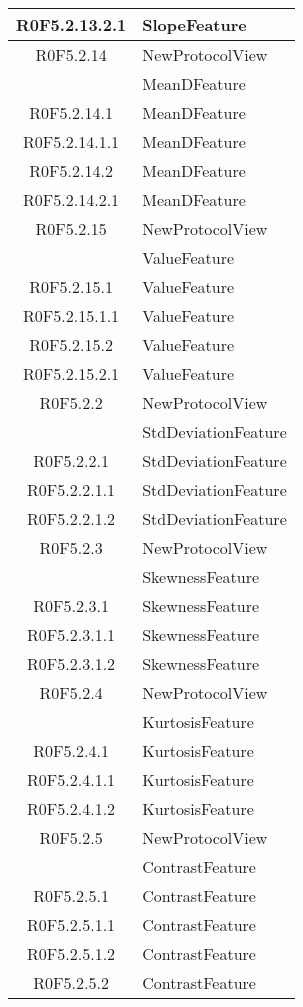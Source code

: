 \begin{center}
\begin{longtable}{|c|l|}
\hline
R0F5.2.13.2.1 & SlopeFeature \\ 
\hline
R0F5.2.14 & NewProtocolView \\ 
 & MeanDFeature \\ 
\hline
R0F5.2.14.1 & MeanDFeature \\ 
\hline
R0F5.2.14.1.1 & MeanDFeature \\ 
\hline
R0F5.2.14.2 & MeanDFeature \\ 
\hline
R0F5.2.14.2.1 & MeanDFeature \\ 
\hline
R0F5.2.15 & NewProtocolView \\ 
 & ValueFeature \\ 
\hline
R0F5.2.15.1 & ValueFeature \\ 
\hline
R0F5.2.15.1.1 & ValueFeature \\ 
\hline
R0F5.2.15.2 & ValueFeature \\ 
\hline
R0F5.2.15.2.1 & ValueFeature \\ 
\hline
R0F5.2.2 & NewProtocolView \\ 
 & StdDeviationFeature \\ 
\hline
R0F5.2.2.1 & StdDeviationFeature \\ 
\hline
R0F5.2.2.1.1 & StdDeviationFeature \\ 
\hline
R0F5.2.2.1.2 & StdDeviationFeature \\ 
\hline
R0F5.2.3 & NewProtocolView \\ 
 & SkewnessFeature \\ 
\hline
R0F5.2.3.1 & SkewnessFeature \\ 
\hline
R0F5.2.3.1.1 & SkewnessFeature \\ 
\hline
R0F5.2.3.1.2 & SkewnessFeature \\ 
\hline
R0F5.2.4 & NewProtocolView \\ 
 & KurtosisFeature \\ 
\hline
R0F5.2.4.1 & KurtosisFeature \\ 
\hline
R0F5.2.4.1.1 & KurtosisFeature \\ 
\hline
R0F5.2.4.1.2 & KurtosisFeature \\ 
\hline
R0F5.2.5 & NewProtocolView \\ 
 & ContrastFeature \\ 
\hline
R0F5.2.5.1 & ContrastFeature \\ 
\hline
R0F5.2.5.1.1 & ContrastFeature \\ 
\hline
R0F5.2.5.1.2 & ContrastFeature \\ 
\hline
R0F5.2.5.2 & ContrastFeature \\ 

\end{longtable}
\end{center}
